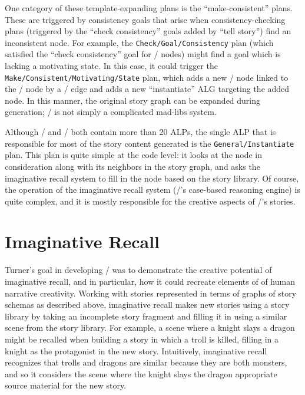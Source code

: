 One category of these template-expanding plans is the ``make-consistent'' plans.
%
These are triggered by consistency goals that arise when consistency-checking plans (triggered by the ``check consistency'' goals added by ``tell story'') find an inconsistent node.
%
For example, the \texttt{Check\abr/Goal\abr/Consistency} plan (which satisfied the ``check consistency'' goal for \gng/ nodes) might find a goal which is lacking a motivating state.
%
In this case, it could trigger the \texttt{Make\abr/Consistent\abr/Motivating\abr/State} plan, which adds a new \gns/ node linked to the \gng/ node by a \gem/ edge and adds a new ``instantiate'' ALG targeting the added node.
%
In this manner, the original story graph can be expanded during generation; \minstrel/ is not simply a complicated mad-libs system.


Although \minstrel/ and \skald/ both contain more than 20 ALPs, the single ALP that is responsible for most of the story content generated is the \texttt{General\abr/Instantiate} plan.
%
This plan is quite simple at the code level: it looks at the node in consideration along with its neighbors in the story graph, and asks the imaginative recall system to fill in the node based on the story library.
%
Of course, the operation of the imaginative recall system (\minstrel/'s case-based reasoning engine) is quite complex, and it is mostly responsible for the creative aspects of \minstrel/'s stories.


\section{Imaginative Recall}

Turner's goal in developing \minstrel/ was to demonstrate the creative potential of imaginative recall, and in particular, how it could recreate elements of of human narrative creativity.
%
Working with stories represented in terms of graphs of story schemas as described above, imaginative recall makes new stories using a story library by taking an incomplete story fragment and filling it in using a similar scene from the story library.
%
For example, a scene where a knight slays a dragon might be recalled when building a story in which a troll is killed, filling in a knight as the protagonist in the new story.
%
Intuitively, imaginative recall recognizes that trolls and dragons are similar because they are both monsters, and so it considers the scene where the knight slays the dragon appropriate source material for the new story.


